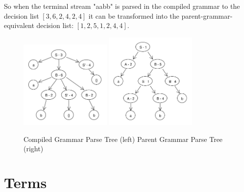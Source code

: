 \documentclass[11pt]{article}
\begin{document}
So when the terminal stream "aabb" is parsed in the compiled
grammar to the decision list $[3, 6, 2, 4, 2, 4]$ it can be transformed
into the parent-grammar-equivalent decision list: $[1, 2, 5, 1, 2, 4, 4]$.

\begin{figure}[h!]
    \centering
    \includegraphics[width=0.4\textwidth,natwidth=458,natheight=444]{compiled_ex.pdf}
    \includegraphics[width=0.4\textwidth,natwidth=472,natheight=500]{decompiled_ex.pdf}
    \caption{Compiled Grammar Parse Tree (left) Parent Grammar Parse Tree (right)}
    \label{fig:comp_to_dec_ex}
\end{figure}

\clearpage

\section*{Terms}
\end{document}
